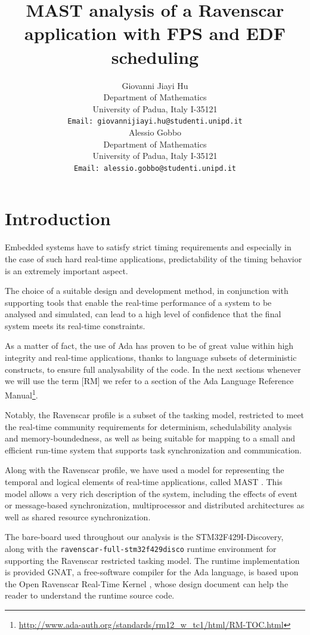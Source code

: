 \documentclass{article}
\title{MAST analysis of a Ravenscar application with FPS and EDF scheduling}
\author{
  Giovanni Jiayi Hu\\
  Department of Mathematics\\
  University of Padua, Italy I-35121\\
  \texttt{Email: giovannijiayi.hu@studenti.unipd.it} \\
   \And
   Alessio Gobbo \\
   Department of Mathematics\\
   University of Padua, Italy I-35121\\
   \texttt{Email: alessio.gobbo@studenti.unipd.it} \\
}
\begin{document}
\maketitle

\begin{abstract}
\lipsum[1]
\end{abstract}



\section{Introduction}

Embedded systems have to satisfy strict timing requirements and especially in the case of such hard real-time applications, predictability of the timing behavior is an extremely important aspect.

The choice of a suitable design and development method, in conjunction with supporting tools that enable the real-time performance of a system to be analysed and simulated, can lead to a high level of confidence that the final system meets its real-time constraints.

As a matter of fact, the use of Ada has proven to be of great value within high integrity and real-time applications, thanks to language subsets of deterministic constructs, to ensure full analysability of the code. In the next sections whenever we will use the term [RM] we refer to a section of the Ada Language Reference Manual\footnote{\url{http://www.ada-auth.org/standards/rm12_w_tc1/html/RM-TOC.html}}.

Notably, the Ravenscar profile \cite{ycs} is a subset of the tasking model, restricted to meet the real-time community requirements for determinism, schedulability analysis and memory-boundedness, as well as being suitable for mapping to a small and efficient run-time system that supports task synchronization and communication.

Along with the Ravenscar profile, we have used a model for representing the temporal and logical elements of real-time applications, called MAST \cite{mast}. This model allows a very rich description of the system, including the effects of event or message-based synchronization, multiprocessor and distributed architectures as well as shared resource synchronization.

The bare-board used throughout our analysis is the STM32F429I-Discovery, along with the \texttt{ravenscar-full-stm32f429disco} runtime environment for supporting the Ravenscar restricted tasking model. The runtime implementation is provided GNAT, a free-software compiler for the Ada language, is based upon the Open Ravenscar Real-Time Kernel \cite{ork}, whose design document can help the reader to understand the runtime source code.
\end{document}
